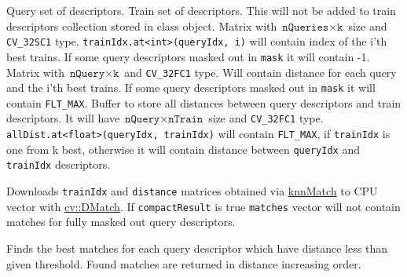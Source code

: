 \begin{description}
 {Query set of descriptors.}
 {Train set of descriptors. This will not be added to train descriptors collection stored in class object.}
 {Matrix with $\texttt{nQueries} \times \texttt{k}$ size and \texttt{CV\_32SC1} type. \texttt{trainIdx.at<int>(queryIdx, i)} will contain index of the i'th best trains. If some query descriptors masked out in \texttt{mask} it will contain -1.}
 {Matrix with $\texttt{nQuery} \times \texttt{k}$ and \texttt{CV\_32FC1} type. Will contain distance for each query and the i'th best trains. If some query descriptors masked out in \texttt{mask} it will contain \texttt{FLT\_MAX}.}
 {Buffer to store all distances between query descriptors and train descriptors. It will have $\texttt{nQuery} \times \texttt{nTrain}$ size and \texttt{CV\_32FC1} type. \texttt{allDist.at<float>(queryIdx, trainIdx)} will contain \texttt{FLT\_MAX}, if \texttt{trainIdx} is one from k best, otherwise it will contain distance between \texttt{queryIdx} and \texttt{trainIdx} descriptors.}
\end{description}


\label{cppfunc.gpu.BruteForceMatcher.knnMatchDownload}
Downloads \texttt{trainIdx} and \texttt{distance} matrices obtained via \hyperref[cppfunc.gpu.BruteForceMatcher.knnMatchSingle]{knnMatch} to CPU vector with \hyperref[cv.class.DMatch]{cv::DMatch}. If \texttt{compactResult} is true \texttt{matches} vector will not contain matches for fully masked out query descriptors.



\label{cppfunc.gpu.BruteForceMatcher.radiusMatch}
Finds the best matches for each query descriptor which have distance less than given threshold. Found matches are returned in distance increasing order.

